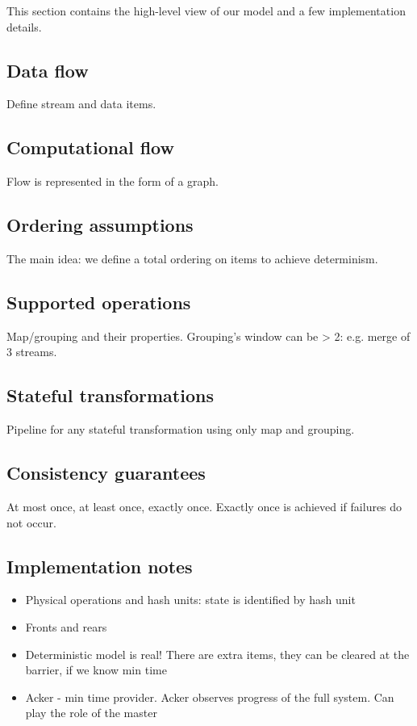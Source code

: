 
\label {fs-model-seciton}

This section contains the high-level view of our model and a few implementation details.

\subsection{Data flow}
Define stream and data items.

\subsection{Computational flow}
Flow is represented in the form of a graph.

\subsection{Ordering assumptions}
The main idea: we define a total ordering on items to achieve determinism.

\subsection{Supported operations}
Map/grouping and their properties. Grouping's window can be > 2: e.g. merge of 3 streams.

\subsection{Stateful transformations}
Pipeline for any stateful transformation using only map and grouping. 

\subsection{Consistency guarantees}
At most once, at least once, exactly once. Exactly once is achieved if failures do not occur.

\subsection{Implementation notes}

\begin{itemize}
    \item Physical operations and hash units: state is identified by hash unit
    \item Fronts and rears
    \item Deterministic model is real! There are extra items, they can be cleared at the barrier, if we know min time  %
    \item Acker - min time provider. Acker observes progress of the full system. Can play the role of the master %
\end{itemize}